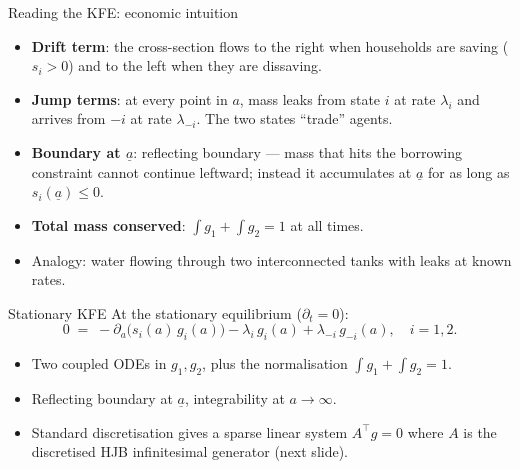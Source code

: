 \begin{frame}{Reading the KFE: economic intuition}
\begin{itemize}
\item \textbf{Drift term}: the cross-section flows to the right when households are saving ($s_i > 0$) and to the left when they are dissaving.
\medskip
\item \textbf{Jump terms}: at every point in $a$, mass leaks from state $i$ at rate $\lambda_i$ and arrives from $-i$ at rate $\lambda_{-i}$. The two states ``trade'' agents.
\medskip
\item \textbf{Boundary at $\underline a$}: reflecting boundary --- mass that hits the borrowing constraint cannot continue leftward; instead it accumulates at $\underline a$ for as long as $s_i(\underline a) \leq 0$.
\medskip
\item \textbf{Total mass conserved}: $\int g_1 + \int g_2 = 1$ at all times.
\medskip
\item Analogy: water flowing through two interconnected tanks with leaks at known rates.
\end{itemize}
\end{frame}

\begin{frame}{Stationary KFE}
At the stationary equilibrium ($\partial_t = 0$):
\[
0 \;=\; -\partial_a\!\big(s_i(a)\, g_i(a)\big) - \lambda_i\, g_i(a) + \lambda_{-i}\, g_{-i}(a),
\quad i = 1, 2.
\]
\medskip

\begin{itemize}
\item Two coupled ODEs in $g_1, g_2$, plus the normalisation $\int g_1 + \int g_2 = 1$.
\medskip
\item Reflecting boundary at $\underline a$, integrability at $a \to \infty$.
\medskip
\item Standard discretisation gives a sparse linear system $A^\top g = 0$ where $A$ is the discretised HJB infinitesimal generator (next slide).
\end{itemize}
\end{frame}


